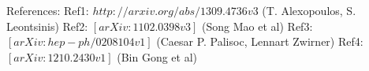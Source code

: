 \documentclass[a4paper,12pt]{article}
\begin{document}




References:
Ref1: $http://arxiv.org/abs/1309.4736v3$ (T. Alexopoulos, S. Leontsinis)
Ref2: $[arXiv:1102.0398v3]$ (Song Mao et al)
Ref3: $[arXiv:hep-ph/0208104v1]$ (Caesar P. Palisoc, Lennart Zwirner)
Ref4: $[arXiv:1210.2430v1]$ (Bin Gong et al)
\end{document}
